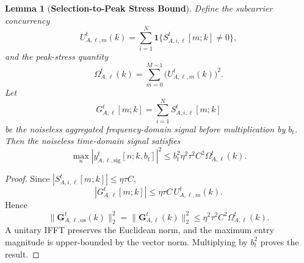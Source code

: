 \documentclass[conference]{IEEEtran}
\newtheorem{lemma}{Lemma}
\begin{document}
\begin{lemma}[\bf Selection-to-Peak Stress Bound]
    \label{lemma:peak_stress}
    Define the subcarrier concurrency
    \begin{equation}
        U_{A,\ell,m}^t(k)=\sum_{i=1}^{N}\mathbf{1}\{S_{A,i,\ell}^t[m;k]\neq0\},
    \end{equation}
    and the peak-stress quantity
    \begin{equation}
        \Omega_{A,\ell}^t(k)=\sum_{m=0}^{M-1}\big(U_{A,\ell,m}^t(k)\big)^2.
    \end{equation}
    Let
    \begin{equation}
        G_{A,\ell}^t[m;k]=\sum_{i=1}^{N}S_{A,i,\ell}^t[m;k]
    \end{equation}
    be the noiseless aggregated frequency-domain signal before multiplication by $b_t$. Then the noiseless time-domain signal satisfies
    \begin{equation}
        \max_n\left|y_{A,\ell,\mathrm{sig}}^t[n;k,b_t]\right|^2
        \le
        b_t^2\eta^2\tau^2C^2\Omega_{A,\ell}^t(k).
    \end{equation}
\end{lemma}
\begin{proof}
    Since $|S_{A,i,\ell}^t[m;k]|\le\eta\tau C$,
    \begin{equation}
        |G_{A,\ell}^t[m;k]|\le \eta\tau C\,U_{A,\ell,m}^t(k).
    \end{equation}
    Hence
    \begin{equation}
        \|\mathbf{G}_{A,\ell,\mathrm{os}}^t(k)\|_2^2
        =\|\mathbf{G}_{A,\ell}^t(k)\|_2^2
        \le \eta^2\tau^2C^2\Omega_{A,\ell}^t(k).
    \end{equation}
    A unitary IFFT preserves the Euclidean norm, and the maximum entry magnitude is upper-bounded by the vector norm. Multiplying by $b_t^2$ proves the result.
\end{proof}
\end{document}
